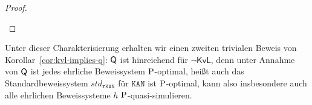 \begin{proof}
\begin{prooflist}




    \end{prooflist}
\end{proof}

Unter dieser Charakterisierung erhalten wir einen zweiten trivialen Beweis von Korollar~\ref{cor:kvl-implies-q}: $\hQ$ ist hinreichend für $\neg\mathsf{KvL}$, denn unter Annahme von $\hQ$ ist jedes ehrliche Beweissystem $\P$-optimal, heißt auch das Standardbeweissystem $\mathit{std}_{\mathtt{rKAN}}$ für $\mathtt{KAN}$ ist $\P$-optimal, kann also insbesondere auch alle ehrlichen Beweissysteme $h$ $\P$-quasi-simulieren.

